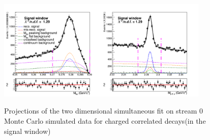 \begin{figure}[H]
    \centering
    
    {\includegraphics[width=0.90\textwidth]{04-SimultaneousFit/figs/charged_corrSignal_window_Total_2DFit_stream0.png}}
    \caption{Projections of the two dimensional simultaneous fit on stream 0 Monte Carlo simulated data for charged correlated decays(in the signal window) }
    \label{fig:charged_corrSignal_window_Total_2DFit_stream0}
    \end{figure}

\begin{table}[H]
    \centering
    \caption{Charged correlated decays: comparison of fitted and expected signal yields, fitted and truth-matched total signal for six streams of Belle generic MC when fitting the two dimensional distributions of $M_{bc}$ and $M(p K \pi)$.}
    \label{tab:SixStreams_chargedCorrLam2Dfits}
    \end{table}
    

